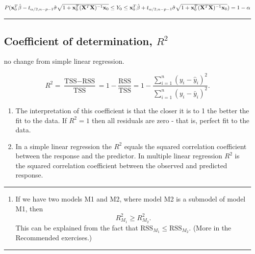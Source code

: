 \documentclass[]{article}
\providecommand{\tightlist}{%
  \setlength{\itemsep}{0pt}\setlength{\parskip}{0pt}}
\begin{document}
\(P({\bf x}_0^T \hat{\beta}-t_{\alpha/2,n-p-1}\hat{\sigma}\sqrt{1+{\bf x}_0^T({\bf X}^T{\bf X})^{-1}{\bf x}_0} \le Y_0 \le {\bf x}_0^T \hat{\beta}+t_{\alpha/2,n-p-1}\hat{\sigma}\sqrt{1+{\bf x}_0^T({\bf X}^T{\bf X})^{-1}{\bf x}_0})=1-\alpha\)

\begin{center}\rule{0.5\linewidth}{\linethickness}\end{center}

\hypertarget{coefficient-of-determination-r2-1}{%
\subsection{\texorpdfstring{Coefficient of determination,
\(R^2\)}{Coefficient of determination, R\^{}2}}\label{coefficient-of-determination-r2-1}}

no change from simple linear regression.

\[R^2 = \frac{\text{TSS}-\text{RSS}}{\text{TSS}}= 1-\frac{\text{RSS}}{\text{TSS}}=1-\frac{\sum_{i=1}^n(y_i-\hat{y}_i)^2}{\sum_{i=1}^n(y_i-\bar{y}_i)^2}.\]

\begin{enumerate}
\def\labelenumi{\arabic{enumi}.}
\item
  The interpretation of this coefficient is that the closer it is to 1
  the better the fit to the data. If \(R^2=1\) then all residuals are
  zero - that is, perfect fit to the data.
\item
  In a simple linear regression the \(R^2\) equals the squared
  correlation coefficient between the response and the predictor. In
  multiple linear regression \(R^2\) is the squared correlation
  coefficient between the observed and predicted response.
\end{enumerate}

\begin{center}\rule{0.5\linewidth}{\linethickness}\end{center}

\begin{enumerate}
\def\labelenumi{\arabic{enumi}.}
\setcounter{enumi}{2}
\tightlist
\item
  If we have two models M1 and M2, where model M2 is a submodel of model
  M1, then \[ R^2_{M_1}\ge R^2_{M_2}.\] This can be explained from the
  fact that \(\text{RSS}_{M_1}\le \text{RSS}_{M_2}\). (More in the
  Recommended exercises.)
\end{enumerate}

\begin{center}\rule{0.5\linewidth}{\linethickness}\end{center}
\end{document}
